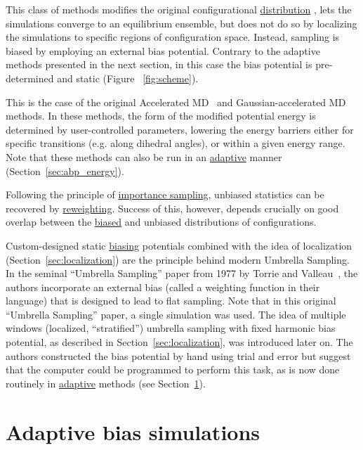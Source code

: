 \documentclass[9pt,review]{livecoms}
\begin{document}
This class of methods modifies the original configurational \hyperlink{ref:Distribution} {distribution} , lets the simulations converge to an equilibrium ensemble, but does not do so by localizing the simulations to specific regions of configuration space. Instead, sampling is biased by employing an external bias potential. Contrary to the adaptive methods presented in the next section, in this case the bias potential is pre-determined and static (Figure ~\ref{fig:scheme}).

This is the case of the original Accelerated MD~\cite{Hamelberg2004} and Gaussian-accelerated MD~\cite{Miao2017, Wang2021} methods. In these methods, the form of the modified potential energy is determined by user-controlled parameters, lowering the energy barriers either for specific transitions (e.g. along dihedral angles), or within a given energy range. Note that these methods can also be run in an \hyperlink{ref:Adaptive} {adaptive} manner (Section~\ref{sec:abp_energy}). 

Following the principle of \hyperlink{ref:IS} {importance sampling}, unbiased statistics can be recovered by \hyperlink{ref:Reweighting} {reweighting}.
Success of this, however, depends crucially on good overlap between the \hyperlink{ref:BiasedDist} {biased} and unbiased distributions of configurations.

Custom-designed static \hyperlink{ref:biasingE} {biasing} potentials combined with the idea of localization (Section~\ref{sec:localization}) are the principle behind modern Umbrella Sampling. In the seminal ``Umbrella Sampling'' paper from 1977 by Torrie and Valleau~\cite{TORRIE1977187}, the authors incorporate an external bias (called a weighting function in their language) that is designed to lead to flat sampling. Note that in this original ``Umbrella Sampling'' paper, a single simulation was used. The idea of multiple windows (localized, ``stratified'') umbrella sampling with fixed harmonic bias potential, as described in Section~\ref{sec:localization}, was introduced later on. The authors constructed the bias potential by hand using trial and error but suggest that the computer could be programmed to perform this task, as is now done routinely in \hyperlink{ref:Adaptive} {adaptive} methods (see Section~\ref{sec:AdaptiveBiasSimulations}).


\section{Adaptive bias simulations}
\label{sec:AdaptiveBiasSimulations}
\end{document}
